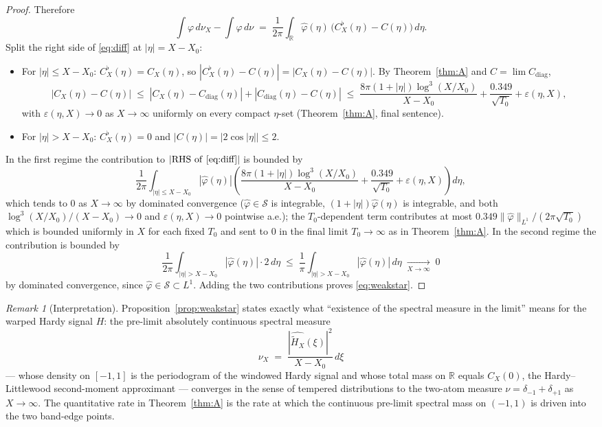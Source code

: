 \documentclass[11pt]{article}
\theoremstyle{definition}
\theoremstyle{remark}
\newtheorem{remark}[theorem]{Remark}
\begin{document}
\begin{proof}
Therefore
\begin{equation}\label{eq:diff}
  \int\varphi\,d\nu_X-\int\varphi\,d\nu\;=\;\frac{1}{2\pi}\int_{\mathbb{R}}\widehat\varphi(\eta)\,\bigl(C_X^{\flat}(\eta)-C(\eta)\bigr)\,d\eta.
\end{equation}
Split the right side of \eqref{eq:diff} at $|\eta|=X-X_0$:
\begin{itemize}
\item For $|\eta|\le X-X_0$: $C_X^{\flat}(\eta)=C_X(\eta)$, so $|C_X^{\flat}(\eta)-C(\eta)|=|C_X(\eta)-C(\eta)|$. By Theorem~\ref{thm:A} and $C=\lim C_{\mathrm{diag}}$,
\[
  |C_X(\eta)-C(\eta)|\;\le\;|C_X(\eta)-C_{\mathrm{diag}}(\eta)|+|C_{\mathrm{diag}}(\eta)-C(\eta)|\;\le\;\frac{8\pi(1+|\eta|)\log^3(X/X_0)}{X-X_0}+\frac{0.349}{\sqrt{T_0}}+\varepsilon(\eta,X),
\]
with $\varepsilon(\eta,X)\to 0$ as $X\to\infty$ uniformly on every compact $\eta$-set (Theorem~\ref{thm:A}, final sentence).
\item For $|\eta|>X-X_0$: $C_X^{\flat}(\eta)=0$ and $|C(\eta)|=|2\cos|\eta||\le 2$.
\end{itemize}
In the first regime the contribution to $|{\rm RHS\ of\ }\eqref{eq:diff}|$ is bounded by
\[
  \frac{1}{2\pi}\int_{|\eta|\le X-X_0}|\widehat\varphi(\eta)|\left(\frac{8\pi(1+|\eta|)\log^3(X/X_0)}{X-X_0}+\frac{0.349}{\sqrt{T_0}}+\varepsilon(\eta,X)\right)d\eta,
\]
which tends to $0$ as $X\to\infty$ by dominated convergence ($\widehat\varphi\in\mathcal{S}$ is integrable, $(1+|\eta|)\widehat\varphi(\eta)$ is integrable, and both $\log^3(X/X_0)/(X-X_0)\to 0$ and $\varepsilon(\eta,X)\to 0$ pointwise a.e.); the $T_0$-dependent term contributes at most $0.349\|\widehat\varphi\|_{L^1}/(2\pi\sqrt{T_0})$ which is bounded uniformly in $X$ for each fixed $T_0$ and sent to $0$ in the final limit $T_0\to\infty$ as in Theorem~\ref{thm:A}.
In the second regime the contribution is bounded by
\[
  \frac{1}{2\pi}\int_{|\eta|>X-X_0}|\widehat\varphi(\eta)|\cdot 2\,d\eta\;\le\;\frac{1}{\pi}\int_{|\eta|>X-X_0}|\widehat\varphi(\eta)|\,d\eta\;\xrightarrow[X\to\infty]{}\;0
\]
by dominated convergence, since $\widehat\varphi\in\mathcal{S}\subset L^1$. Adding the two contributions proves \eqref{eq:weakstar}.
\end{proof}

\begin{remark}[Interpretation]\label{rem:interp}
Proposition~\ref{prop:weakstar} states exactly what ``existence of the spectral measure in the limit'' means for the warped Hardy signal $H$: the pre-limit absolutely continuous spectral measure
\[
  \nu_X\;=\;\frac{|\widehat{\widetilde H_X}(\xi)|^2}{X-X_0}\,d\xi
\]
--- whose density on $[-1,1]$ is the periodogram of the windowed Hardy signal and whose total mass on $\mathbb{R}$ equals $C_X(0)$, the Hardy--Littlewood second-moment approximant --- converges in the sense of tempered distributions to the two-atom measure $\nu=\delta_{-1}+\delta_{+1}$ as $X\to\infty$. The quantitative rate in Theorem~\ref{thm:A} is the rate at which the continuous pre-limit spectral mass on $(-1,1)$ is driven into the two band-edge points.
\end{remark}
\end{document}
